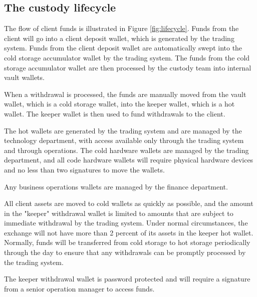 \subsection{The custody lifecycle}
The flow of client funds is illustrated in Figure \ref{fig:lifecycle}.  Funds from the
client will go into a client deposit wallet, which is generated by the
trading system.  Funds from the client deposit wallet are
automatically swept into the cold storage accumulator wallet by the trading
system.  The funds from the cold storage accumulator wallet are then
processed by the custody team into internal vault wallets.

When a withdrawal is processed, the funds are manually moved from the
vault wallet, which is a cold storage wallet, into the keeper wallet, which is a hot wallet.  The keeper wallet
is then used to fund withdrawals to the client.

The hot wallets are generated by the trading system and are managed by
the technology department, with access available only through the
trading system and through operations.  The cold hardware wallets are
managed by the trading department, and all code hardware wallets will
require physical hardware devices and no less than two signatures to
move the wallets.

Any business operations wallets are managed by the finance
department.

All client assets are moved to cold wallets as quickly as possible,
and the amount in the "keeper" withdrawal wallet is limited to
amounts that are subject to immediate withdrawal by the trading
system.  Under normal circumstances, the exchange will not have more
than 2 percent of its assets in the keeper hot wallet.  Normally,
funds will be transferred from cold storage to hot storage periodically
through the day to ensure that any withdrawals can be
promptly processed by the trading system.

The keeper withdrawal wallet is password protected and will require a
signature from a senior operation manager to access funds.

